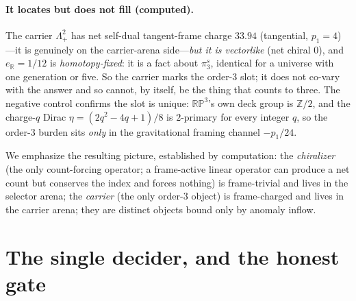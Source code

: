 \documentclass[11pt]{article}
\theoremstyle{definition}
\theoremstyle{remark}
\newcommand{\Z}{\mathbb{Z}}
\newcommand{\R}{\mathbb{R}}
\newcommand{\RP}{\mathbb{RP}}
\newcommand{\pis}{\pi_3^{s}}
\newcommand{\Lamp}{\Lambda^2_{+}}
\newcommand{\eR}{e_{\R}}
\begin{document}
\paragraph{It locates but does not fill (computed).} The carrier $\Lamp$ has net self-dual tangent-frame charge
$33.94$ (tangential, $p_1=4$)---it is genuinely on the carrier-arena side---\emph{but it is vectorlike} (net
chiral $0$), and $\eR = 1/12$ is \emph{homotopy-fixed}: it is a fact about $\pis$, identical for a universe with
one generation or five. So the carrier marks the order-$3$ slot; it does not co-vary with the answer and so
cannot, by itself, be the thing that counts to three. The negative control confirms the slot is unique: $\RP^3$'s
own deck group is $\Z/2$, and the charge-$q$ Dirac $\eta = (2q^2-4q+1)/8$ is $2$-primary for every integer $q$,
so the order-$3$ burden sits \emph{only} in the gravitational framing channel $-p_1/24$.

We emphasize the resulting picture, established by computation: the \emph{chiralizer} (the only count-forcing
operator; a frame-active linear operator can produce a net count but conserves the index and forces nothing) is
frame-trivial and lives in the selector arena; the \emph{carrier} (the only order-$3$ object) is frame-charged
and lives in the carrier arena; they are distinct objects bound only by anomaly inflow.

\section{The single decider, and the honest gate}\label{sec:decider}
\end{document}
